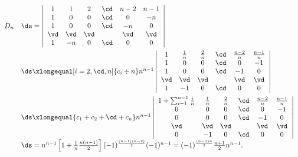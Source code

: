\begin{frame}
\begin{jie}
$$
\begin{array}{ll}
  D_n & \ds = \left|
        \begin{array}{cccccc}
          1   &  1 &  2 & \cd &  n-2 & n-1\\
          1   &  0 &  0 & \cd &   0  & -n \\
          1   &  0 &  0 & \cd &  -n  & 0\\
          \vd & \vd & \vd&     & \vd  & \vd \\
          1   & -n &  0 & \cd &   0   & 0
        \end{array}
                                        \right| \\[1.0cm]
      &  \ds \xlongequal[i=2,\cd,n]{c_i\div n} n^{n-1} 
        \left|
        \begin{array}{cccccc}
          1   &  \frac 1n & \frac 2n & \cd &  \frac{n-2}n & \frac{n-1}n\\
          1   &  0 &  0 & \cd &   0  & -1 \\
          1   &  0 &  0 & \cd &  -1  & 0\\
          \vd & \vd & \vd&     & \vd  & \vd \\
          1   & -1 &  0 & \cd &   0   & 0
        \end{array}
                                        \right|\\[1.0cm]
      & \ds \xlongequal{c_1+c_2+\cd+c_n} 
        n^{n-1} \left|
        \begin{array}{cccccc}
          1+\sum_{i-1}^{n-1}\frac in   &  \frac 1n & \frac 2n & \cd &  \frac{n-2}n & \frac{n-1}n\\
          0   &  0 &  0 & \cd &   0  & -1 \\
          0   &  0 &  0 & \cd &  -1  & 0\\
          \vd & \vd & \vd&     & \vd  & \vd \\
          0   & -1 &  0 & \cd &   0   & 0
        \end{array}       
                                        \right|\\[0.8cm]
      &  \ds= n^{n-1} \left[ 1 + \frac 1n \frac {n(n-1)}2\right] 
        (-1)^{\frac{(n-1)(n-2)}2}(-1)^{n-1} = (-1)^{\frac{(n-1)n}2} \frac{n+1}2 n^{n-1}.
\end{array}
$$

\end{jie}

\end{frame}

